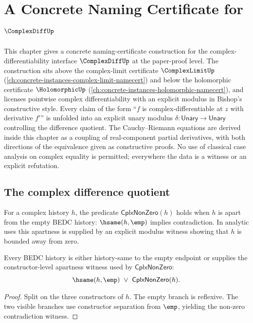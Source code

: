 \chapter{A Concrete Naming Certificate for \(\ComplexDiffUp\)}
\label{ch:concrete-instances-complex-diff-namecert}

This chapter gives a concrete naming-certificate construction for the complex-differentiability interface \(\ComplexDiffUp\) at the paper-proof level. The construction sits above the complex-limit certificate \(\ComplexLimitUp\) (\autoref{ch:concrete-instances-complex-limit-namecert}) and below the holomorphic certificate \(\HolomorphicUp\) (\autoref{ch:concrete-instances-holomorphic-namecert}), and licenses pointwise complex differentiability with an explicit modulus in Bishop's constructive style. Every claim of the form ``\(f\) is complex-differentiable at \(z\) with derivative \(f'\)'' is unfolded into an explicit unary modulus \(\delta : \mathsf{Unary} \to \mathsf{Unary}\) controlling the difference quotient. The Cauchy--Riemann equations are derived inside this chapter as a coupling of real-component partial derivatives, with both directions of the equivalence given as constructive proofs. No use of classical case analysis on complex equality is permitted; everywhere the data is a witness or an explicit refutation.

\section{The complex difference quotient}

\begin{definition}
\label{def:cplx-non-zero}
For a complex history \(h\), the predicate \(\mathsf{CplxNonZero}(h)\) holds when \(h\) is apart from the empty BEDC history: \(\hsame(h,\emp)\) implies contradiction. In analytic uses this apartness is supplied by an explicit modulus witness showing that \(h\) is bounded away from zero.
\end{definition}

\begin{theorem}
\label{thm:cplx-nonzero-empty-or-nonzero}
Every BEDC history is either history-same to the empty endpoint or supplies the
constructor-level apartness witness used by \(\mathsf{CplxNonZero}\):
$$
\hsame(h,\emp)\ \vee\ \mathsf{CplxNonZero}(h).
$$
\end{theorem}
\begin{proof}
Split on the three constructors of \(h\). The empty branch is reflexive. The
two visible branches use constructor separation from \(\emp\), yielding the
non-zero contradiction witness.
\end{proof}

